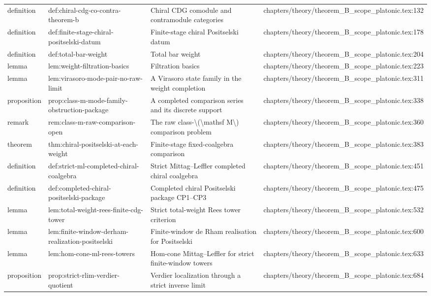 \documentclass[11pt]{article}
\begin{document}
\begin{longtable}{L{0.10\textwidth}L{0.26\textwidth}L{0.42\textwidth}L{0.22\textwidth}}
definition & def:chiral-cdg-co-contra-theorem-b & Chiral CDG comodule and contramodule categories & chapters/theory/theorem\_B\_scope\_platonic.tex:132\\
definition & def:finite-stage-chiral-positselski-datum & Finite-stage chiral Positselski datum & chapters/theory/theorem\_B\_scope\_platonic.tex:178\\
definition & def:total-bar-weight & Total bar weight & chapters/theory/theorem\_B\_scope\_platonic.tex:204\\
lemma & lem:weight-filtration-basics & Filtration basics & chapters/theory/theorem\_B\_scope\_platonic.tex:223\\
lemma & lem:virasoro-mode-pair-no-raw-limit & A Virasoro state family in the weight completion & chapters/theory/theorem\_B\_scope\_platonic.tex:311\\
proposition & prop:class-m-mode-family-obstruction-package & A completed comparison series and its discrete support & chapters/theory/theorem\_B\_scope\_platonic.tex:338\\
remark & rem:class-m-raw-comparison-op{}en & The raw class-\textbackslash{}(\textbackslash{}mathsf M\textbackslash{}) comparison problem & chapters/theory/theorem\_B\_scope\_platonic.tex:360\\
theorem & thm:chiral-positselski-at-each-weight & Finite-stage fixed-coalgebra comparison & chapters/theory/theorem\_B\_scope\_platonic.tex:383\\
definition & def:strict-ml-completed-chiral-coalgebra & Strict Mittag--Leffler completed chiral coalgebra & chapters/theory/theorem\_B\_scope\_platonic.tex:451\\
definition & def:completed-chiral-positselski-package & Completed chiral Positselski package CP1--CP3 & chapters/theory/theorem\_B\_scope\_platonic.tex:475\\
lemma & lem:total-weight-rees-finite-cdg-tower & Strict total-weight Rees tower criterion & chapters/theory/theorem\_B\_scope\_platonic.tex:532\\
lemma & lem:finite-window-derham-realization-positselski & Finite-window de Rham realisation for Positselski & chapters/theory/theorem\_B\_scope\_platonic.tex:600\\
lemma & lem:hom-cone-ml-rees-towers & Hom-cone Mittag--Leffler for strict finite-window towers & chapters/theory/theorem\_B\_scope\_platonic.tex:633\\
proposition & prop:strict-rlim-verdier-quotient & Verdier localization through a strict inverse limit & chapters/theory/theorem\_B\_scope\_platonic.tex:684\\

\end{longtable}
\end{document}
